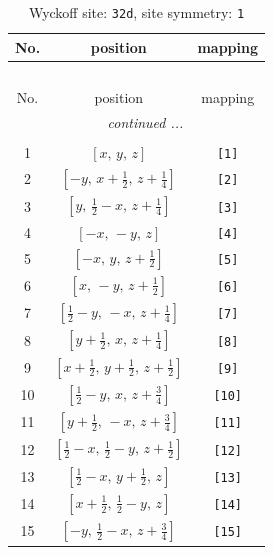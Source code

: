 \documentclass[fleqn,8pt]{jsarticle}
\begin{document}
\renewcommand{\arraystretch}{1.2}
\begin{longtable}{ccc}
\caption{Wyckoff site: {\tt 32d}, site symmetry: {\tt 1}}
 \\
 \hline \hline
No. & position & mapping \\ \hline \endfirsthead

\multicolumn{2}{l}{\tablename\ \thetable{}} \\
 \hline \hline
No. & position & mapping \\ \hline \endhead

 \hline \hline
\multicolumn{2}{r}{\footnotesize\it continued ...} \\ \endfoot

 \hline \hline
\multicolumn{2}{r}{} \\ \endlastfoot

1 & $\left[ x,\, y,\, z \right]$ & {\tt [1]} \\ \hline
2 & $\left[ - y,\, x + \frac{1}{2},\, z + \frac{1}{4} \right]$ & {\tt [2]} \\ \hline
3 & $\left[ y,\, \frac{1}{2} - x,\, z + \frac{1}{4} \right]$ & {\tt [3]} \\ \hline
4 & $\left[ - x,\, - y,\, z \right]$ & {\tt [4]} \\ \hline
5 & $\left[ - x,\, y,\, z + \frac{1}{2} \right]$ & {\tt [5]} \\ \hline
6 & $\left[ x,\, - y,\, z + \frac{1}{2} \right]$ & {\tt [6]} \\ \hline
7 & $\left[ \frac{1}{2} - y,\, - x,\, z + \frac{1}{4} \right]$ & {\tt [7]} \\ \hline
8 & $\left[ y + \frac{1}{2},\, x,\, z + \frac{1}{4} \right]$ & {\tt [8]} \\ \hline
9 & $\left[ x + \frac{1}{2},\, y + \frac{1}{2},\, z + \frac{1}{2} \right]$ & {\tt [9]} \\ \hline
10 & $\left[ \frac{1}{2} - y,\, x,\, z + \frac{3}{4} \right]$ & {\tt [10]} \\ \hline
11 & $\left[ y + \frac{1}{2},\, - x,\, z + \frac{3}{4} \right]$ & {\tt [11]} \\ \hline
12 & $\left[ \frac{1}{2} - x,\, \frac{1}{2} - y,\, z + \frac{1}{2} \right]$ & {\tt [12]} \\ \hline
13 & $\left[ \frac{1}{2} - x,\, y + \frac{1}{2},\, z \right]$ & {\tt [13]} \\ \hline
14 & $\left[ x + \frac{1}{2},\, \frac{1}{2} - y,\, z \right]$ & {\tt [14]} \\ \hline
15 & $\left[ - y,\, \frac{1}{2} - x,\, z + \frac{3}{4} \right]$ & {\tt [15]} \\ \hline

\end{longtable}
\end{document}
